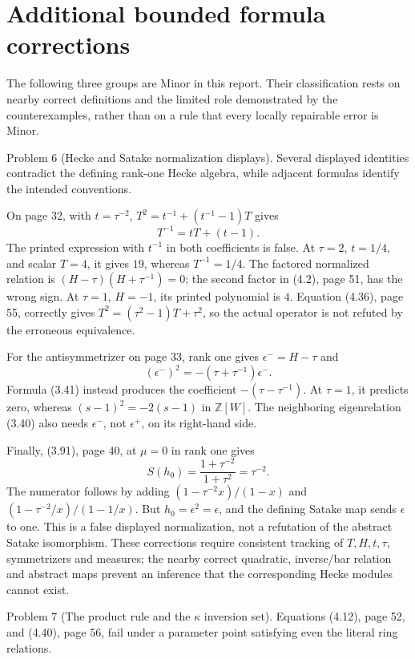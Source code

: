 \documentclass[10pt]{article}
\begin{document}
\section*{Additional bounded formula corrections}
The following three groups are Minor in this report. Their classification rests on nearby correct definitions and the limited role demonstrated by the counterexamples, rather than on a rule that every locally repairable error is Minor.\par
Problem 6 (Hecke and Satake normalization displays).  Several displayed identities contradict the defining rank-one Hecke algebra, while adjacent formulas identify the intended conventions.\par
On page 32, with \(t=\tau^{-2}\), \(T^2=t^{-1}+(t^{-1}-1)T\) gives \[T^{-1}=tT+(t-1).\] The printed expression with \(t^{-1}\) in both coefficients is false. At \(\tau=2\), \(t=1/4\), and scalar \(T=4\), it gives \(19\), whereas \(T^{-1}=1/4\). The factored normalized relation is \((H-\tau)(H+\tau^{-1})=0\); the second factor in (4.2), page 51, has the wrong sign. At \(\tau=1\), \(H=-1\), its printed polynomial is \(4\). Equation (4.36), page 55, correctly gives \(T^2=(\tau^2-1)T+\tau^2\), so the actual operator is not refuted by the erroneous equivalence.\par
For the antisymmetrizer on page 33, rank one gives \(\epsilon^-=H-\tau\) and \[(\epsilon^-)^2=-(\tau+\tau^{-1})\epsilon^-.\] Formula (3.41) instead produces the coefficient \(-(\tau-\tau^{-1})\). At \(\tau=1\), it predicts zero, whereas \((s-1)^2=-2(s-1)\) in \(\mathbb Z[W]\). The neighboring eigenrelation (3.40) also needs \(\epsilon^-\), not \(\epsilon^+\), on its right-hand side.\par
Finally, (3.91), page 40, at \(\mu=0\) in rank one gives \[S(h_0)=\frac{1+\tau^{-2}}{1+\tau^2}=\tau^{-2}.\] The numerator follows by adding \((1-\tau^{-2}x)/(1-x)\) and \((1-\tau^{-2}/x)/(1-1/x)\). But \(h_0=\epsilon^2=\epsilon\), and the defining Satake map sends \(\epsilon\) to one. This is a false displayed normalization, not a refutation of the abstract Satake isomorphism. These corrections require consistent tracking of \(T,H,t,\tau\), symmetrizers and measures; the nearby correct quadratic, inverse/bar relation and abstract maps prevent an inference that the corresponding Hecke modules cannot exist.\par
Problem 7 (The product rule and the \(\kappa\) inversion set).  Equations (4.12), page 52, and (4.40), page 56, fail under a parameter point satisfying even the literal ring relations.\par
\end{document}
